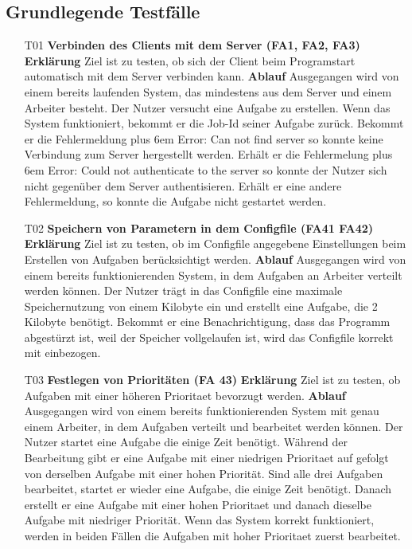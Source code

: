 \documentclass[a4paper,12pt]{article}
\makeatletter
\newenvironment{mycode}
 {\def\@xobeysp{\ }\verbatim\rightskip=0pt plus 6em\relax}
 {\endverbatim}
\makeatother
\begin{document}
\subsection{Grundlegende Testfälle}

\begin{itemize}
\item[T01] \textbf{Verbinden des Clients mit dem Server (FA1, FA2, FA3)}
\subitem \textbf{Erklärung} Ziel ist zu testen, ob sich der Client beim Programstart automatisch mit dem Server verbinden kann.
\subitem \textbf{Ablauf} Ausgegangen wird von einem bereits laufenden System, das mindestens aus dem Server und einem Arbeiter besteht.
Der Nutzer versucht eine Aufgabe zu erstellen.
Wenn das System funktioniert, bekommt er die Job-Id seiner Aufgabe zurück.
Bekommt er die Fehlermeldung
\begin{mycode}
Error: Can not find server
\end{mycode}
so konnte keine Verbindung zum Server hergestellt werden. Erhält er die Fehlermelung
\begin{mycode}
Error: Could not authenticate to the server
\end{mycode}
so konnte der Nutzer sich nicht gegenüber dem Server authentisieren. Erhält er eine andere Fehlermeldung, so konnte die Aufgabe nicht gestartet werden.

\item[T02] \textbf{Speichern von Parametern in dem \gls{Configfile} (FA41 FA42)}
\subitem \textbf{Erklärung} Ziel ist zu testen, ob im \gls{Configfile} angegebene Einstellungen beim Erstellen von Aufgaben berücksichtigt werden.
\subitem \textbf{Ablauf} Ausgegangen wird von einem bereits funktionierenden System, in dem Aufgaben an Arbeiter verteilt werden können.
Der Nutzer trägt in das \gls{Configfile} eine maximale Speichernutzung von einem Kilobyte ein und erstellt eine Aufgabe, die 2 Kilobyte benötigt.
Bekommt er eine Benachrichtigung, dass das Programm abgestürzt ist, weil der Speicher vollgelaufen ist, wird das \gls{Configfile} korrekt mit einbezogen.

\item[T03] \textbf{Festlegen von Prioritäten (FA 43)}
\subitem \textbf{Erklärung} Ziel ist zu testen, ob Aufgaben mit einer höheren \gls{Prioritaet} bevorzugt werden.
\subitem \textbf{Ablauf} Ausgegangen wird von einem bereits funktionierenden System mit genau einem Arbeiter, in dem Aufgaben verteilt und bearbeitet werden können.
Der Nutzer startet eine Aufgabe die einige Zeit benötigt. Während der Bearbeitung gibt er eine Aufgabe mit einer niedrigen \gls{Prioritaet} auf gefolgt von derselben Aufgabe mit einer hohen Priorität.
Sind alle drei Aufgaben bearbeitet, startet er wieder eine Aufgabe, die einige Zeit benötigt. Danach erstellt er eine Aufgabe mit einer hohen \gls{Prioritaet} und danach dieselbe Aufgabe mit niedriger Priorität.
Wenn das System korrekt funktioniert, werden in beiden Fällen die Aufgaben mit hoher \gls{Prioritaet} zuerst bearbeitet.


\end{itemize}
\end{document}
